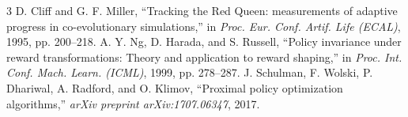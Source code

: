 \documentclass[conference,a4paper]{IEEEtran}
\begin{document}
\begin{thebibliography}{3}
 D. Cliff and G. F. Miller, ``Tracking the Red Queen: measurements of adaptive progress in co-evolutionary simulations,'' in \textit{Proc. Eur. Conf. Artif. Life (ECAL)}, 1995, pp. 200--218.
 A. Y. Ng, D. Harada, and S. Russell, ``Policy invariance under reward transformations: Theory and application to reward shaping,'' in \textit{Proc. Int. Conf. Mach. Learn. (ICML)}, 1999, pp. 278--287.
 J. Schulman, F. Wolski, P. Dhariwal, A. Radford, and O. Klimov, ``Proximal policy optimization algorithms,'' \textit{arXiv preprint arXiv:1707.06347}, 2017.
\end{thebibliography}
\end{document}
